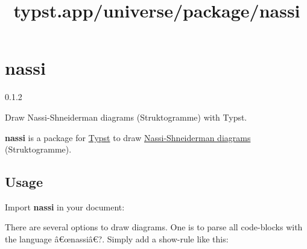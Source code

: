 \title{typst.app/universe/package/nassi}

\label{banner}
\section{nassi}\label{nassi}

{ 0.1.2 }

Draw Nassi-Shneiderman diagrams (Struktogramme) with Typst.

\label{readme}
\textbf{nassi} is a package for \href{https://typst.app/}{Typst} to draw
\href{https://en.wikipedia.org/wiki/Nassi\%E2\%80\%93Shneiderman_diagram}{Nassi-Shneiderman
diagrams} (Struktogramme).


\subsection{Usage}\label{usage}

Import \textbf{nassi} in your document:

\begin{Shaded}
\begin{Highlighting}[]
\end{Highlighting}
\end{Shaded}

There are several options to draw diagrams. One is to parse all
code-blocks with the language â€œnassiâ€?. Simply add a show-rule like
this:

\begin{Shaded}
\begin{Highlighting}[]

\NormalTok{\textasciigrave{}\textasciigrave{}\textasciigrave{}}
\end{Highlighting}
\end{Shaded}

